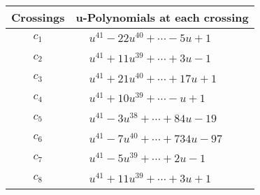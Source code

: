 \documentclass[1p]{elsarticle_modified}
\theoremstyle{definition}
\begin{document}
\begin{tabular}{m{50pt}|m{274pt}}
Crossings & \hspace{64pt}u-Polynomials at each crossing \\
\hline $$\begin{aligned}c_{1}\end{aligned}$$&$\begin{aligned}
&u^{41}-22 u^{40}+\cdots-5 u+1
\end{aligned}$\\
\hline $$\begin{aligned}c_{2}\end{aligned}$$&$\begin{aligned}
&u^{41}+11 u^{39}+\cdots+3 u-1
\end{aligned}$\\
\hline $$\begin{aligned}c_{3}\end{aligned}$$&$\begin{aligned}
&u^{41}+21 u^{40}+\cdots+17 u+1
\end{aligned}$\\
\hline $$\begin{aligned}c_{4}\end{aligned}$$&$\begin{aligned}
&u^{41}+10 u^{39}+\cdots- u+1
\end{aligned}$\\
\hline $$\begin{aligned}c_{5}\end{aligned}$$&$\begin{aligned}
&u^{41}-3 u^{38}+\cdots+84 u-19
\end{aligned}$\\
\hline $$\begin{aligned}c_{6}\end{aligned}$$&$\begin{aligned}
&u^{41}-7 u^{40}+\cdots+734 u-97
\end{aligned}$\\
\hline $$\begin{aligned}c_{7}\end{aligned}$$&$\begin{aligned}
&u^{41}-5 u^{39}+\cdots+2 u-1
\end{aligned}$\\
\hline $$\begin{aligned}c_{8}\end{aligned}$$&$\begin{aligned}
&u^{41}+11 u^{39}+\cdots+3 u+1
\end{aligned}$\\

\end{tabular}
\end{document}
